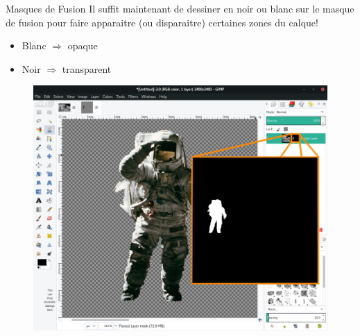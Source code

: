 \documentclass[10pt,svgnames,usenames,table]{beamer}
\begin{document}
	\begin{frame}{Masques de Fusion}
		Il suffit maintenant de dessiner en noir ou blanc sur le masque de fusion pour faire apparaitre (ou disparaitre) certaines zones du calque!
		\begin{itemize}
			\item Blanc $\Longrightarrow $ opaque
			\item Noir $ \Longrightarrow $ transparent
		\end{itemize}
		\begin{center}
			\begin{figure}
				\includegraphics[scale=.15]{Images/mask/mask3}		
			\end{figure}
		\end{center}
	\end{frame}
	
\end{document}
